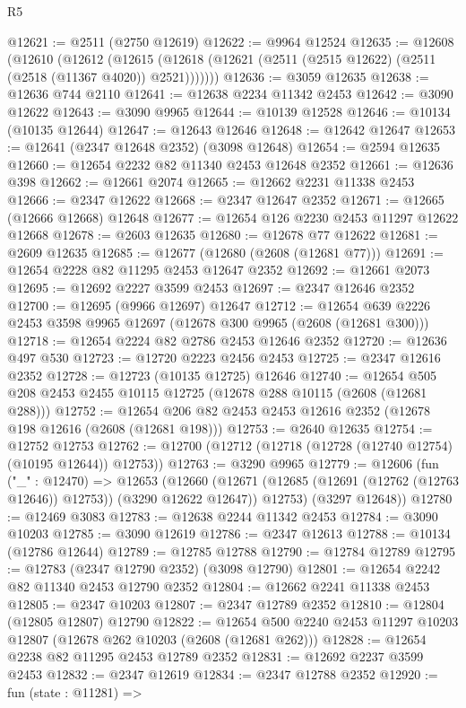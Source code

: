 \begin{lexlean}{R5}
\begin{coremodule}
@12621 := @2511 (@2750 @12619)
@12622 := @9964 @12524
@12635 := @12608
    (@12610
      (@12612
        (@12615 (@12618 (@12621 (@2511 (@2515 @12622) (@2511 (@2518 (@11367 @4020)) @2521)))))))
@12636 := @3059 @12635
@12638 := @12636 @744 @2110
@12641 := @12638 @2234 @11342 @2453
@12642 := @3090 @12622
@12643 := @3090 @9965
@12644 := @10139 @12528
@12646 := @10134 (@10135 @12644)
@12647 := @12643 @12646
@12648 := @12642 @12647
@12653 := @12641 (@2347 @12648 @2352) (@3098 @12648)
@12654 := @2594 @12635
@12660 := @12654 @2232 @82 @11340 @2453 @12648 @2352
@12661 := @12636 @398
@12662 := @12661 @2074
@12665 := @12662 @2231 @11338 @2453
@12666 := @2347 @12622
@12668 := @2347 @12647 @2352
@12671 := @12665 (@12666 @12668) @12648
@12677 := @12654 @126 @2230 @2453 @11297 @12622 @12668
@12678 := @2603 @12635
@12680 := @12678 @77 @12622
@12681 := @2609 @12635
@12685 := @12677 (@12680 (@2608 (@12681 @77)))
@12691 := @12654 @2228 @82 @11295 @2453 @12647 @2352
@12692 := @12661 @2073
@12695 := @12692 @2227 @3599 @2453
@12697 := @2347 @12646 @2352
@12700 := @12695 (@9966 @12697) @12647
@12712 := @12654 @639 @2226 @2453 @3598 @9965 @12697 (@12678 @300 @9965 (@2608 (@12681 @300)))
@12718 := @12654 @2224 @82 @2786 @2453 @12646 @2352
@12720 := @12636 @497 @530
@12723 := @12720 @2223 @2456 @2453
@12725 := @2347 @12616 @2352
@12728 := @12723 (@10135 @12725) @12646
@12740 := @12654 @505 @208 @2453 @2455 @10115 @12725 (@12678 @288 @10115 (@2608 (@12681 @288)))
@12752 := @12654 @206 @82 @2453 @2453 @12616 @2352 (@12678 @198 @12616 (@2608 (@12681 @198)))
@12753 := @2640 @12635
@12754 := @12752 @12753
@12762 := @12700 (@12712 (@12718 (@12728 (@12740 @12754) (@10195 @12644)) @12753))
@12763 := @3290 @9965
@12779 := @12606
    (fun ("_" : @12470) =>
    @12653
      (@12660
        (@12671 (@12685 (@12691 (@12762 (@12763 @12646)) @12753)) (@3290 @12622 @12647))
        @12753)
      (@3297 @12648))
@12780 := @12469 @3083
@12783 := @12638 @2244 @11342 @2453
@12784 := @3090 @10203
@12785 := @3090 @12619
@12786 := @2347 @12613
@12788 := @10134 (@12786 @12644)
@12789 := @12785 @12788
@12790 := @12784 @12789
@12795 := @12783 (@2347 @12790 @2352) (@3098 @12790)
@12801 := @12654 @2242 @82 @11340 @2453 @12790 @2352
@12804 := @12662 @2241 @11338 @2453
@12805 := @2347 @10203
@12807 := @2347 @12789 @2352
@12810 := @12804 (@12805 @12807) @12790
@12822 := @12654 @500 @2240 @2453 @11297 @10203 @12807 (@12678 @262 @10203 (@2608 (@12681 @262)))
@12828 := @12654 @2238 @82 @11295 @2453 @12789 @2352
@12831 := @12692 @2237 @3599 @2453
@12832 := @2347 @12619
@12834 := @2347 @12788 @2352
@12920 := fun (state : @11281) =>

\end{coremodule}
\end{lexlean}
